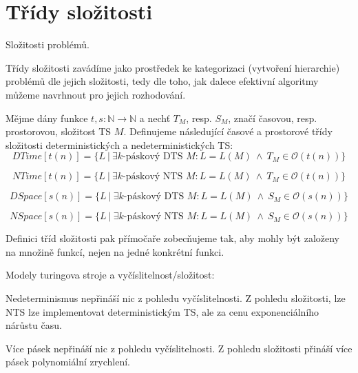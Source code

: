
\section{Třídy složitosti}

\begin{compactitem}
    \item Složitosti problémů.

    \item Třídy složitosti zavádíme jako prostředek ke kategorizaci (vytvoření hierarchie) problémů dle jejich složitosti, tedy dle toho, jak dalece efektivní algoritmy můžeme navrhnout pro jejich rozhodování.

    \item Mějme dány funkce $t, s : \mathbb{N} \rightarrow \mathbb{N}$ a nechť $T_M$, resp. $S_M$, značí časovou, resp. prostorovou, složitost TS $M$. Definujeme následující časové a prostorové třídy složitosti deterministických a nedeterministických TS:
    $$DTime[ t(n) ] = \{ L ~|~ \exists k \text{-páskový DTS } M : L = L(M) ~\land~ T_M \in \mathcal{O}(t(n)) \}$$

    $$NTime[ t(n) ] = \{ L ~|~ \exists k \text{-páskový NTS } M : L = L(M) ~\land~ T_M \in \mathcal{O}(t(n)) \}$$

    $$DSpace[ s(n) ] = \{ L ~|~ \exists k \text{-páskový DTS } M : L = L(M) ~\land~ S_M \in \mathcal{O}(s(n)) \}$$

    $$NSpace[ s(n) ] = \{ L ~|~ \exists k \text{-páskový NTS } M : L = L(M) ~\land~ S_M \in \mathcal{O}(s(n)) \}$$

    \item Definici tříd složitosti pak přímočaře zobecňujeme tak, aby mohly být založeny na množině funkcí, nejen na jedné konkrétní funkci.

    \item Modely turingova stroje a vyčíslitelnost/složitost: \begin{compactitem}

        \item Nedeterminismus nepřináší nic z pohledu vyčíslitelnosti. Z pohledu složitosti, lze NTS lze implementovat deterministickým TS, ale za cenu exponenciálního nárůstu času.

        \item Více pásek nepřináší nic z pohledu vyčíslitelnosti. Z pohledu složitosti přináší více pásek polynomiální zrychlení.

    \end{compactitem}
\end{compactitem}

